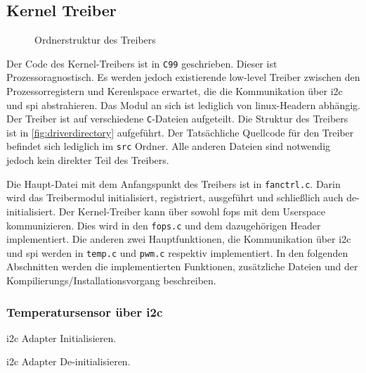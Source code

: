 \subsection{Kernel Treiber}

\begin{wrapfigure}[22]{o}[1cm]{8cm}
\caption{Ordnerstruktur des Treibers}
\label{fig:driverdirectory}
\end{wrapfigure}

Der Code des Kernel-Treibers ist in \texttt{C99} geschrieben.
Dieser ist Prozessoragnostisch.
Es werden jedoch existierende low-level Treiber zwischen den Prozessorregistern und Kerenlspace erwartet, die die Kommunikation über \gls{i2c} und \gls{spi} abstrahieren.
Das Modul an sich ist lediglich von linux-Headern abhängig.
Der Treiber ist auf verschiedene \texttt{C}-Dateien aufgeteilt.
Die Struktur des Treibers ist in \autoref{fig:driverdirectory} aufgeführt.
Der Tatsächliche Quellcode für den Treiber befindet sich lediglich im \texttt{src} Ordner.
Alle anderen Dateien sind notwendig jedoch kein direkter Teil des Treibers.

Die Haupt-Datei mit dem Anfangspunkt des Treibers ist in \texttt{fanctrl.c}.
Darin wird das Treibermodul initialisiert, registriert, ausgeführt und schließlich auch de-initialisiert.
Der Kernel-Treiber kann über sowohl \gls{fops} mit dem Userspace kommunizieren.
Dies wird in den \texttt{fops.c} und dem dazugehörigen Header implementiert. %
Die anderen zwei Hauptfunktionen, die Kommunikation über \gls{i2c} und \gls{spi} werden in \texttt{temp.c} und \texttt{pwm.c} respektiv implementiert.
In den folgenden Abschnitten werden die implementierten Funktionen, zusätzliche Dateien und der Kompilierungs/Installationsvorgang beschreiben.

\subsubsection{Temperatursensor über \acrshort{i2c}}

\Gls{i2c} Adapter Initialisieren.


\Gls{i2c} Adapter De-initialisieren.


